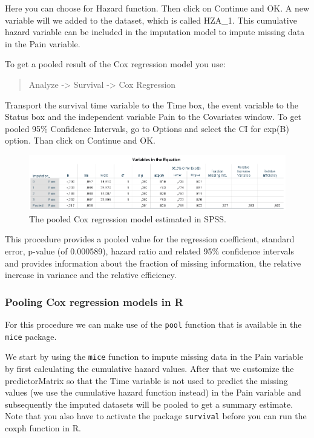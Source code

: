 \documentclass[
]{book}
\begin{document}
Here you can choose for Hazard function. Then click on Continue and OK.
A new variable will we added to the dataset, which is called HZA\_1.
This cumulative hazard variable can be included in the imputation model
to impute missing data in the Pain variable.

To get a pooled result of the Cox regression model you use:

\begin{quote}
Analyze -\textgreater{} Survival -\textgreater{} Cox Regression
\end{quote}

Transport the survival time variable to the Time box, the event variable
to the Status box and the independent variable Pain to the Covariates
window. To get pooled 95\% Confidence Intervals, go to Options and
select the CI for exp(B) option. Than click on Continue and OK.

\begin{figure}

{\centering \includegraphics[width=0.9\linewidth]{images/table5.10} 

}

\caption{The pooled Cox regression model estimated in SPSS.}\label{fig:tab5-10}
\end{figure}

This procedure provides a pooled value for the regression coefficient,
standard error, p-value (of 0.000589), hazard ratio and related 95\%
confidence intervals and provides information about the fraction of
missing information, the relative increase in variance and the relative
efficiency.

\hypertarget{pooling-cox-regression-models-in-r}{%
\subsubsection{Pooling Cox regression models in
R}\label{pooling-cox-regression-models-in-r}}

For this procedure we can make use of the \texttt{pool} function that is
available in the \texttt{mice} package.

We start by using the \texttt{mice} function to impute missing data in
the Pain variable by first calculating the cumulative hazard values.
After that we customize the predictorMatrix so that the Time variable is
not used to predict the missing values (we use the cumulative hazard
function instead) in the Pain variable and subsequently the imputed
datasets will be pooled to get a summary estimate. Note that you also
have to activate the package \texttt{survival} before you can run the
coxph function in R.
\end{document}

